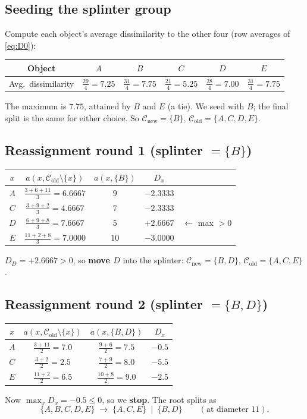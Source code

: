 \documentclass[11pt,a4paper]{report}
\theoremstyle{definition}
\theoremstyle{plain}
\theoremstyle{remark}
\newcommand{\C}{\mathcal{C}}
\begin{document}
\subsection*{Seeding the splinter group}
Compute each object's average dissimilarity to the other four (row averages of
\eqref{eq:D0}):
\begin{center}
\begin{tabular}{@{}cccccc@{}}
\toprule
Object & $A$ & $B$ & $C$ & $D$ & $E$\\
\midrule
Avg.\ dissimilarity & $\tfrac{29}{4}{=}7.25$ & $\tfrac{31}{4}{=}7.75$
 & $\tfrac{21}{4}{=}5.25$ & $\tfrac{28}{4}{=}7.00$ & $\tfrac{31}{4}{=}7.75$\\
\bottomrule
\end{tabular}
\end{center}
The maximum is $7.75$, attained by $B$ and $E$ (a tie). We seed with $B$; the
final split is the same for either choice. So
$\C_{\text{new}}=\{B\}$, $\C_{\text{old}}=\{A,C,D,E\}$.

\subsection*{Reassignment round 1 (splinter $=\{B\}$)}
\begin{center}
\begin{tabular}{@{}ccccc@{}}
\toprule
$x$ & $a(x,\C_{\text{old}}\setminus\{x\})$ & $a(x,\{B\})$ & $D_x$ & \\
\midrule
$A$ & $\tfrac{3+6+11}{3}=6.6667$ & $9$  & $-2.3333$ & \\
$C$ & $\tfrac{3+9+2}{3}=4.6667$  & $7$  & $-2.3333$ & \\
$D$ & $\tfrac{6+9+8}{3}=7.6667$  & $5$  & $\mathbf{+2.6667}$ & $\leftarrow$ max $>0$\\
$E$ & $\tfrac{11+2+8}{3}=7.0000$ & $10$ & $-3.0000$ & \\
\bottomrule
\end{tabular}
\end{center}
$D_D=+2.6667>0$, so \textbf{move $D$} into the splinter:
$\C_{\text{new}}=\{B,D\}$, $\C_{\text{old}}=\{A,C,E\}$.

\subsection*{Reassignment round 2 (splinter $=\{B,D\}$)}
\begin{center}
\begin{tabular}{@{}cccc@{}}
\toprule
$x$ & $a(x,\C_{\text{old}}\setminus\{x\})$ & $a(x,\{B,D\})$ & $D_x$\\
\midrule
$A$ & $\tfrac{3+11}{2}=7.0$ & $\tfrac{9+6}{2}=7.5$  & $-0.5$\\
$C$ & $\tfrac{3+2}{2}=2.5$  & $\tfrac{7+9}{2}=8.0$  & $-5.5$\\
$E$ & $\tfrac{11+2}{2}=6.5$ & $\tfrac{10+8}{2}=9.0$ & $-2.5$\\
\bottomrule
\end{tabular}
\end{center}
Now $\max_x D_x=-0.5\le0$, so we \textbf{stop}. The root splits as
\[
\{A,B,C,D,E\}\;\longrightarrow\;\{A,C,E\}\ \mid\ \{B,D\}\qquad(\text{at diameter }11).
\]
\end{document}
